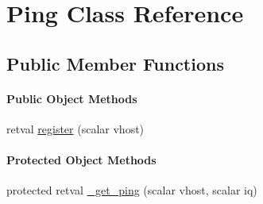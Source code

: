 \hypertarget{class_d_jabberd_1_1_plugin_1_1_ping}{
\section{\-Ping \-Class \-Reference}
\label{class_d_jabberd_1_1_plugin_1_1_ping}
}
\subsection*{\-Public \-Member \-Functions}
\begin{Indent}\paragraph*{\-Public \-Object \-Methods}
\begin{DoxyCompactItemize}
\item 
retval \hyperlink{class_d_jabberd_1_1_plugin_1_1_ping_ad74fd0b541e604cd2a3dd55e48bb8fde}{register} (scalar vhost)
\end{DoxyCompactItemize}
\end{Indent}
\begin{Indent}\paragraph*{\-Protected \-Object \-Methods}
\begin{DoxyCompactItemize}
\item 
protected retval \hyperlink{class_d_jabberd_1_1_plugin_1_1_ping_a624d58b4ae40ae756d8e05206a3b54d8}{\-\_\-get\-\_\-ping} (scalar vhost, scalar iq)
\end{DoxyCompactItemize}
\end{Indent}


